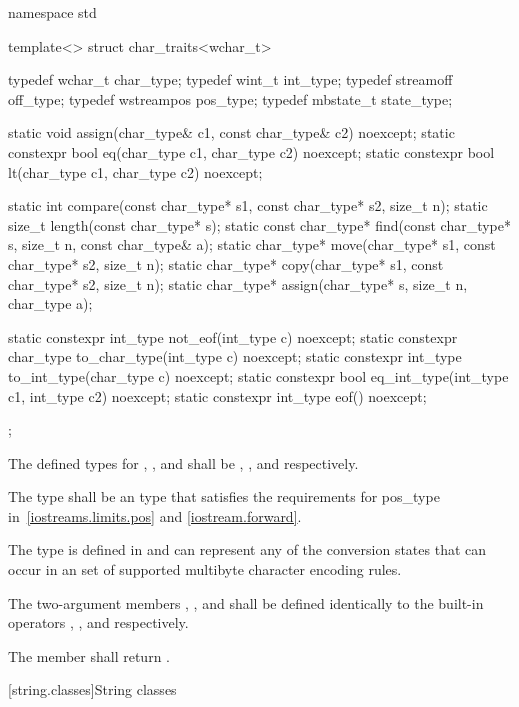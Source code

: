 %
\begin{codeblock}
namespace std {
  template<> struct char_traits<wchar_t> {
    typedef wchar_t      char_type;
    typedef wint_t       int_type;
    typedef streamoff    off_type;
    typedef wstreampos   pos_type;
    typedef mbstate_t    state_type;

    static void assign(char_type& c1, const char_type& c2) noexcept;
    static constexpr bool eq(char_type c1, char_type c2) noexcept;
    static constexpr bool lt(char_type c1, char_type c2) noexcept;

    static int compare(const char_type* s1, const char_type* s2, size_t n);
    static size_t length(const char_type* s);
    static const char_type* find(const char_type* s, size_t n,
                 const char_type& a);
    static char_type* move(char_type* s1, const char_type* s2, size_t n);
    static char_type* copy(char_type* s1, const char_type* s2, size_t n);
    static char_type* assign(char_type* s, size_t n, char_type a);

    static constexpr int_type not_eof(int_type c) noexcept;
    static constexpr char_type to_char_type(int_type c) noexcept;
    static constexpr int_type to_int_type(char_type c) noexcept;
    static constexpr bool eq_int_type(int_type c1, int_type c2) noexcept;
    static constexpr int_type eof() noexcept;
  };
}
\end{codeblock}

\pnum
The defined types for
,
,
and
shall be
,
,
and
respectively.

\pnum
The type
shall be an  type that satisfies the requirements
for pos_type in~\ref{iostreams.limits.pos} and \ref{iostream.forward}.

\pnum
The type
is defined in
and can represent any of the conversion states that can occur in an  set of supported multibyte character encoding rules.

\pnum
The two-argument members
,
,
and
shall be defined identically
to the built-in operators
\tcode{=},
\tcode{==},
and
\tcode{<}
respectively.

\pnum
The member
shall return
.

[string.classes]{String classes}


